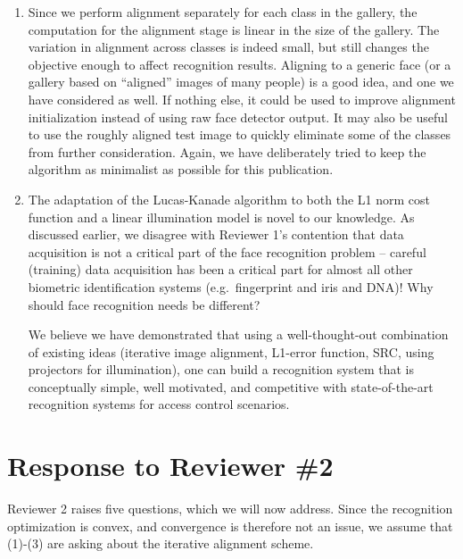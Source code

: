 \documentclass[11pt]{article}
\begin{document}
\begin{enumerate}
\item Since we perform alignment separately for each class in the gallery, the
computation for the alignment stage is linear in the size of the gallery.  The
variation in alignment across classes is indeed small, but still changes the
objective enough to affect recognition results.  Aligning to a generic face (or
a gallery based on ``aligned'' images of many people) is a good idea, and one we
have considered as well.  If nothing else, it could be used to improve
alignment initialization instead of using raw face detector output.  It may
also be useful to use the roughly aligned test image to quickly eliminate some
of the classes from further consideration.  Again, we have deliberately tried
to keep the algorithm as minimalist as possible for this publication.

\item The adaptation of the Lucas-Kanade algorithm to both the L1 norm cost
function and a linear illumination model is novel to our knowledge.  As
discussed earlier, we disagree with Reviewer 1's contention that data
acquisition is not a critical part of the face recognition problem -- careful (training) 
data acquisition has been a critical part for almost all other biometric identification 
systems (e.g.\ fingerprint and iris and DNA)! Why should face recognition needs be different? 

We believe we have demonstrated that using a well-thought-out combination of existing ideas
(iterative image alignment, L1-error function, SRC, using projectors for
illumination), one can build a recognition system that is conceptually simple, well
motivated, and competitive with state-of-the-art recognition systems for access
control scenarios.

\end{enumerate}

\section{Response to Reviewer \#2}
Reviewer 2 raises five questions, which we will now address.  Since the
recognition optimization is convex, and convergence is therefore not an issue, we assume
that (1)-(3) are asking about the iterative alignment scheme.
\end{document}
